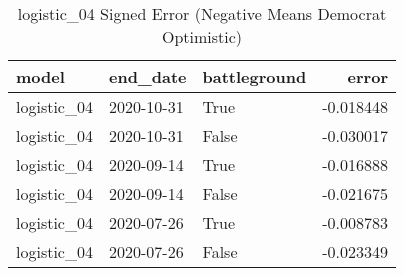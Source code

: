 \begin{table}
\centering
\caption{logistic_04 Signed Error
(Negative Means Democrat Optimistic)}
\label{table:logistic\_04\_signed\_error\_time\_series}
\begin{tabular}{lllr}
\toprule
       model &    end\_date &  battleground &     error \\
\midrule
 logistic\_04 &  2020-10-31 &          True & -0.018448 \\
 logistic\_04 &  2020-10-31 &         False & -0.030017 \\
 logistic\_04 &  2020-09-14 &          True & -0.016888 \\
 logistic\_04 &  2020-09-14 &         False & -0.021675 \\
 logistic\_04 &  2020-07-26 &          True & -0.008783 \\
 logistic\_04 &  2020-07-26 &         False & -0.023349 \\
\bottomrule
\end{tabular}
\end{table}
